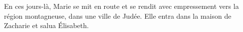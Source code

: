 En ces jours-là, Marie se mit en route 
	et se rendit avec empressement vers la région montagneuse, dans une ville de Judée.
Elle entra dans la maison de Zacharie et salua Élisabeth.
